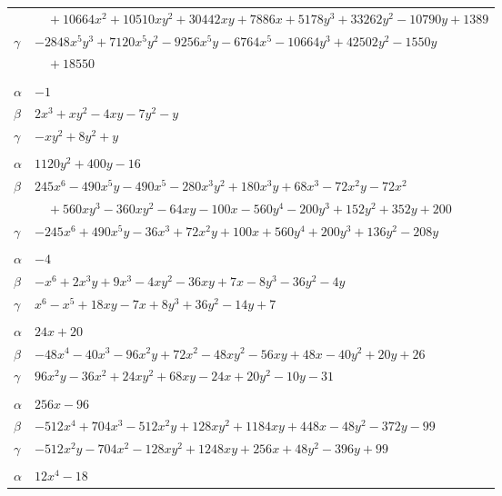 \documentclass[11pt]{article}
\begin{document}
\begin{longtable}{@{}ll@{}}
 & $\quad +10664x^{2}+10510xy^{2}+30442xy+7886x+5178y^{3}+33262y^{2}-10790y+1389$\\
$\gamma$ & $-2848x^{5}y^{3}+7120x^{5}y^{2}-9256x^{5}y-6764x^{5}-10664y^{3}+42502y^{2}-1550y$\\
 & $\quad +18550$\\
\addlinespace[3pt]
\multicolumn{2}{@{}l}{$\{i,j\}=\{15,17\}$, $k_{ij}=1$}\\
$\alpha$ & $-1$\\
$\beta$ & $2x^{3}+xy^{2}-4xy-7y^{2}-y$\\
$\gamma$ & $-xy^{2}+8y^{2}+y$\\
\addlinespace[3pt]
\multicolumn{2}{@{}l}{$\{i,j\}=\{15,20\}$, $k_{ij}=2^{4}$}\\
$\alpha$ & $1120y^{2}+400y-16$\\
$\beta$ & $245x^{6}-490x^{5}y-490x^{5}-280x^{3}y^{2}+180x^{3}y+68x^{3}-72x^{2}y-72x^{2}$\\
 & $\quad +560xy^{3}-360xy^{2}-64xy-100x-560y^{4}-200y^{3}+152y^{2}+352y+200$\\
$\gamma$ & $-245x^{6}+490x^{5}y-36x^{3}+72x^{2}y+100x+560y^{4}+200y^{3}+136y^{2}-208y$\\
\addlinespace[3pt]
\multicolumn{2}{@{}l}{$\{i,j\}=\{15,21\}$, $k_{ij}=11$}\\
$\alpha$ & $-4$\\
$\beta$ & $-x^{6}+2x^{3}y+9x^{3}-4xy^{2}-36xy+7x-8y^{3}-36y^{2}-4y$\\
$\gamma$ & $x^{6}-x^{5}+18xy-7x+8y^{3}+36y^{2}-14y+7$\\
\addlinespace[3pt]
\multicolumn{2}{@{}l}{$\{i,j\}=\{15,26\}$, $k_{ij}=11$}\\
$\alpha$ & $24x+20$\\
$\beta$ & $-48x^{4}-40x^{3}-96x^{2}y+72x^{2}-48xy^{2}-56xy+48x-40y^{2}+20y+26$\\
$\gamma$ & $96x^{2}y-36x^{2}+24xy^{2}+68xy-24x+20y^{2}-10y-31$\\
\addlinespace[3pt]
\multicolumn{2}{@{}l}{$\{i,j\}=\{16,21\}$, $k_{ij}=3\cdot 5\cdot 13$}\\
$\alpha$ & $256x-96$\\
$\beta$ & $-512x^{4}+704x^{3}-512x^{2}y+128xy^{2}+1184xy+448x-48y^{2}-372y-99$\\
$\gamma$ & $-512x^{2}y-704x^{2}-128xy^{2}+1248xy+256x+48y^{2}-396y+99$\\
\addlinespace[3pt]
\multicolumn{2}{@{}l}{$\{i,j\}=\{16,27\}$, $k_{ij}=2\cdot 3^{2}$}\\
$\alpha$ & $12x^{4}-18$\\

\end{longtable}
\end{document}
